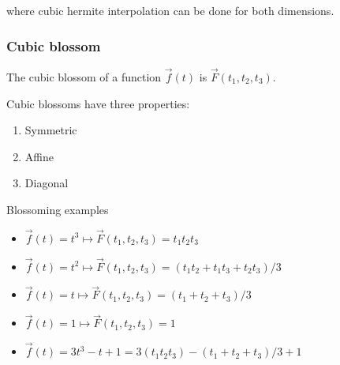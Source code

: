 \documentclass[12pt]{article}
\begin{document}
where cubic hermite interpolation can be done for both dimensions.

\subsubsection{Cubic blossom}

The cubic blossom of a function $\vec f(t)$ is $\vec F(t_1,t_2,t_3)$.

Cubic blossoms have three properties:
\begin{enumerate}
    \item Symmetric
    \item Affine
    \item Diagonal
\end{enumerate}

Blossoming examples
\begin{itemize}
    \item $\vec f(t) = t^3 \mapsto \vec F(t_1,t_2,t_3) = t_1t_2t_3$
    \item $\vec f(t) = t^2 \mapsto \vec F(t_1,t_2,t_3) = (t_1t_2 + 
            t_1t_3 + t_2t_3)/3$
    \item $\vec f(t) = t \mapsto \vec F(t_1,t_2,t_3) = (t_1 + t_2
            + t_3)/3$
    \item $\vec f(t) = 1 \mapsto \vec F(t_1,t_2,t_3) = 1$
    \item $\vec f(t) = 3t^3 - t + 1 = 3(t_1t_2t_3) - (t_1 + t_2
            + t_3)/3 + 1$
\end{itemize}
\end{document}
